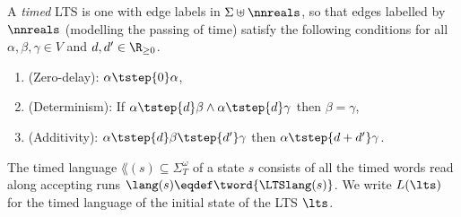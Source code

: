 A \emph{timed} LTS is one with edge labels in $\Sigma\uplus\nnreals$,
so that edges labelled by $\nnreals$ (modelling the passing of time) satisfy the following conditions
for all $\alpha,\beta,\gamma\in V$ and $d,d'\in \R_{\ge 0}$.
\begin{enumerate}
    \item (Zero-delay): $\alpha\tstep{0}\alpha$,
    \item (Determinism): If
        $
        \alpha\tstep{d}\beta
        \land
        \alpha\tstep{d}\gamma$ then $\beta=\gamma$,
    \item (Additivity): $\alpha\tstep{d}\beta\tstep{d'}\gamma$ then $\alpha\tstep{d+d'}\gamma$.
\end{enumerate}
The {timed language} $\lang(s)\subseteq \Sigma_T^\omega$ of a state $s$
consists of all the timed words read along accepting runs $\lang(s)\eqdef \tword{\LTSlang(s)}$. We write $L(\lts)$ for the timed language of the initial state of the LTS $\lts$.

